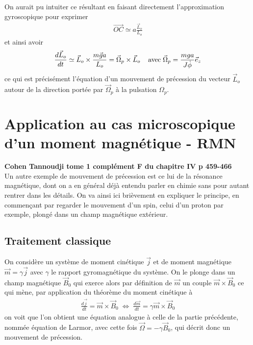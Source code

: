 \documentclass[12pt,prb,aps,epsf]{article}
\begin{document}
On aurait pu intuiter ce résultant en faisant directement l'approximation gyroscopique pour exprimer 
\begin{eqnarray}
\vec{OC} \simeq a\frac{\vec{L}_o}{L_o}
\end{eqnarray} 
et ainsi avoir 
\begin{eqnarray}
\frac{d\vec{L}_o}{dt} \simeq  \vec{L}_o \times \frac{m\vec{g}a}{L_o}  = \vec{\Omega}_p \times \vec{L}_o \hspace{0.4cm}\mathrm{avec}\; \vec{\Omega}_p = \frac{mga}{J\dot{\phi}}\vec{e}_z
\end{eqnarray}
ce qui est précisément l'équation d'un mouvement de précession du vecteur $\vec{L}_o$ autour de la direction portée par $\vec{\Omega}_p$ à la pulsation $\Omega_p$.

\section{Application au cas microscopique d'un moment magnétique - RMN}

\textbf{Cohen Tannoudji tome 1 complément F du chapitre IV p 459-466}\\

Un autre exemple de mouvement de précession est ce lui de la résonance magnétique, dont on a en général déjà entendu parler en chimie sans pour autant rentrer dans les détails. On va ainsi ici brièvement en expliquer le principe, en commençant par regarder le mouvement d'un spin, celui d'un proton par exemple, plongé dans un champ magnétique extérieur.

\subsection{Traitement classique}

On considère un système de moment cinétique $\vec{j}$ et de moment magnétique $\vec{m}=\gamma \vec{j}$ avec $\gamma$ le rapport gyromagnétique du système. On le plonge dans un champ magnétique $\vec{B}_0$ qui exerce alors par définition de $\vec{m}$ un couple $\vec{m}\times \vec{B}_0$ ce qui mène, par application du théorème du moment cinétique à 
\begin{eqnarray}
\frac{d\vec{j}}{dt} = \vec{m}\times \vec{B}_0 \; \Leftrightarrow \; \frac{d\vec{m}}{dt} = \gamma \vec{m}\times \vec{B}_0 \label{précess}
\end{eqnarray}
on voit que l'on obtient une équation analogue à celle de la partie précédente, nommée équation de Larmor, avec cette fois $\vec{\Omega} = -\gamma\vec{B}_0$, qui décrit donc un mouvement de précession.
\end{document}

